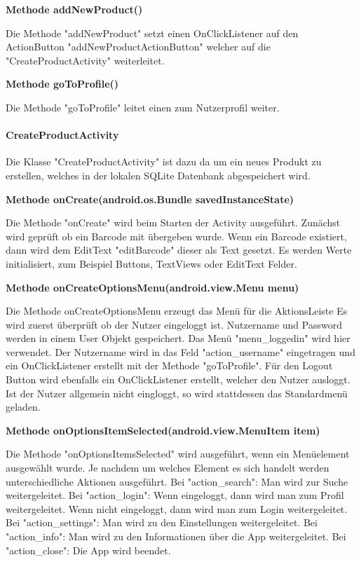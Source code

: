 \documentclass{scrartcl}
\begin{document}
\noindent\textbf{Methode addNewProduct()} 

\noindent Die Methode "addNewProduct" setzt einen OnClickListener auf den ActionButton "addNewProductActionButton" welcher auf die "CreateProductActivity" weiterleitet. \newline

\noindent\textbf{Methode goToProfile()} 

\noindent Die Methode "goToProfile" leitet einen zum Nutzerprofil weiter. \newline

\paragraph{CreateProductActivity}

Die Klasse "CreateProductActivity" ist dazu da um ein neues Produkt zu erstellen, welches in der lokalen SQLite Datenbank abgespeichert wird. \newline

\noindent\textbf{Methode onCreate(android.os.Bundle savedInstanceState)} 

\noindent Die Methode "onCreate" wird beim Starten der Activity ausgeführt. Zunächst wird geprüft ob ein Barcode mit übergeben wurde. Wenn ein Barcode existiert, dann wird dem EditText "editBarcode" dieser als Text gesetzt. Es werden Werte initialisiert, zum Beispiel Buttons, TextViews oder EditText Felder. \newline

\noindent\textbf{Methode onCreateOptionsMenu(android.view.Menu menu)} 

\noindent Die Methode onCreateOptionsMenu erzeugt das Menü für die AktionsLeiste Es wird zuerst überprüft ob der Nutzer eingeloggt ist. Nutzername und Password werden in einem User Objekt gespeichert. Das Menü "menu\_loggedin" wird hier verwendet. Der Nutzername wird in das Feld "action\_username" eingetragen und ein OnClickListener erstellt mit der Methode "goToProfile". Für den Logout Button wird ebenfalls ein OnClickListener erstellt, welcher den Nutzer ausloggt. Ist der Nutzer allgemein nicht eingloggt, so wird stattdessen das Standardmenü geladen. \newline

\noindent\textbf{Methode onOptionsItemSelected(android.view.MenuItem item)} 

\noindent Die Methode "onOptionsItemsSelected" wird ausgeführt, wenn ein Menüelement ausgewählt wurde. Je nachdem um welches Element es sich handelt werden unterschiedliche Aktionen ausgeführt. Bei "action\_search": Man wird zur Suche weitergeleitet. Bei "action\_login": Wenn eingeloggt, dann wird man zum Profil weitergeleitet. Wenn nicht eingeloggt, dann wird man zum Login weitergeleitet. Bei "action\_settings": Man wird zu den Einstellungen weitergeleitet. Bei "action\_info": Man wird zu den Informationen über die App weitergeleitet. Bei "action\_close": Die App wird beendet. \newline
\end{document}
